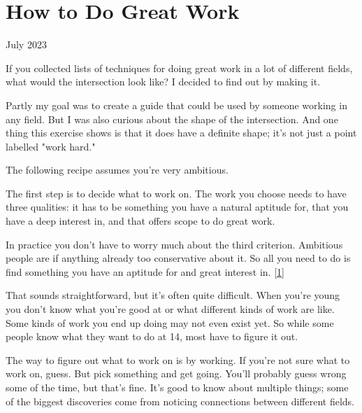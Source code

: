 \chapter{How to Do Great Work}


          
        
          


          
            
              
                

July 2023

If you collected lists of techniques for
                  doing great work in a lot of different fields, what would the
                  intersection look like? I decided to find out by making it.

Partly
                  my goal was to create a guide that could be used by someone
                  working in any field. But I was also curious about the shape
                  of the intersection. And one thing this exercise shows is that
                  it does have a definite shape; it's not just a point labelled
                  "work hard."

The following recipe assumes you're
                  very ambitious.






                  The first step is to decide what to work on. The work you
                  choose needs to have three qualities: it has to be something
                  you have a natural aptitude for, that you have a deep interest
                  in, and that offers scope to do great work.

In
                  practice you don't have to worry much about the third
                  criterion. Ambitious people are if anything already too
                  conservative about it. So all you need to do is find something
                  you have an aptitude for and great interest in.
                  [\href{\#f1n}{1}]

That sounds straightforward, but it's often quite
                  difficult. When you're young you don't know what you're good
                  at or what different kinds of work are like. Some kinds of
                  work you end up doing may not even exist yet. So while some
                  people know what they want to do at 14, most have to figure it
                  out.

The way to figure out what to work on is by
                  working. If you're not sure what to work on, guess. But pick
                  something and get going. You'll probably guess wrong some of
                  the time, but that's fine. It's good to know about multiple
                  things; some of the biggest discoveries come from noticing
                  connections between different fields.

